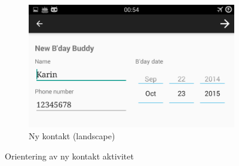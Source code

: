 \begin{figure}[ht]
    \begin{subfigure}[b]{0.6\textwidth}
        \includegraphics[width=\textwidth]{./img/13.png}
        \caption{Ny kontakt (landscape)}
        \label{fig:ny_kontakt_l}
    \end{subfigure}
    \caption{Orientering av ny kontakt aktivitet}
    \label{fig:ny_kontakt_aktivitet}
\end{figure}


